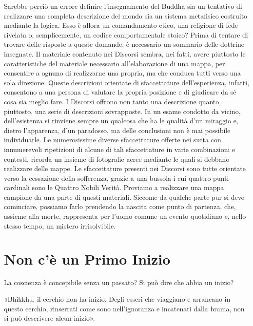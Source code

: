 

 Sarebbe perciò un errore definire l’insegnamento del
Buddha sia un tentativo di realizzare una completa descrizione del mondo
sia un sistema metafisico costruito mediante la logica. Esso è allora un
comandamento etico, una religione di fede rivelata o, semplicemente, un
codice comportamentale stoico? Prima di tentare di trovare delle
risposte a queste domande, è necessario un sommario delle dottrine
insegnate. Il materiale contenuto nei Discorsi sembra, nei fatti, avere
piuttosto le caratteristiche del materiale necessario all’elaborazione
di una mappa, per consentire a ognuno di realizzarne una propria, ma che
conduca tutti verso una sola direzione. Queste descrizioni orientate di
sfaccettature dell’esperienza, infatti, consentono a una persona di
valutare la propria posizione e di giudicare da sé cosa sia meglio fare.
I Discorsi offrono non tanto una descrizione quanto, piuttosto, una
serie di descrizioni sovrapposte. In un esame condotto da vicino,
dell’esistenza si rinviene sempre un qualcosa che ha le qualità d’un
miraggio e, dietro l’apparenza, d’un paradosso, ma delle conclusioni non
è mai possibile individuarle. Le numerosissime diverse sfaccettature
offerte nei sutta con innumerevoli ripetizioni di alcune di tali
sfaccettature in varie combinazioni e contesti, ricorda un insieme di
fotografie aeree mediante le quali si debbano realizzare delle mappe. Le
sfaccettature presenti nei Discorsi sono tutte orientate verso la
cessazione della sofferenza, grazie a una bussola i cui quattro punti
cardinali sono le Quattro Nobili Verità. Proviamo a realizzare una mappa
campione da una parte di questi materiali. Siccome da qualche parte pur
si deve cominciare, possiamo farlo prendendo la nascita come punto di
partenza, che, assieme alla morte, rappresenta per l’uomo comune un
evento quotidiano e, nello stesso tempo, un mistero irrisolvibile.


\hypertarget{x-non-c’è-un-primo-inizio}{\section*{Non c’è un Primo Inizio}}
 La coscienza è concepibile senza un passato? Si può
dire che abbia un inizio?


 «Bhikkhu, il cerchio non ha inizio. Degli esseri che
viaggiano e arrancano in questo cerchio, rinserrati come sono
nell’ignoranza e incatenati dalla brama, non si può descrivere alcun
inizio».


